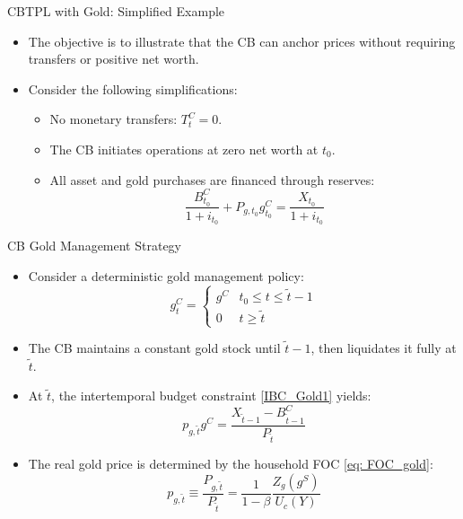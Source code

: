 \documentclass[11pt,aspectratio=169]{beamer}
\begin{document}
\iffalse
\begin{frame}{CBTPL with Gold: Simplified Example}
\begin{itemize}
    \item The objective is to illustrate that the CB can anchor prices without requiring transfers or positive net worth.
    \item Consider the following simplifications:  
    \begin{itemize}
        \item No monetary transfers: $T_t^C = 0$.
        \item The CB initiates operations at zero net worth at $t_0$.
        \item All asset and gold purchases are financed through reserves:
        \begin{equation}
            \frac{B_{t_0}^C}{1+i_{t_0}} + P_{g,t_0} g_{t_0}^C = \frac{X_{t_0}}{1+i_{t_0}}
            \label{BS0}
        \end{equation}
    \end{itemize}
\end{itemize}
\end{frame}

\begin{frame}{CB Gold Management Strategy}
\begin{itemize}
    \item Consider a deterministic gold management policy:
    \[
    g_t^C = \begin{cases} 
    g^C & t_0 \le t \le \tilde{t}-1 \\
    0 & t \ge \tilde{t}
    \end{cases}
    \]
    \item The CB maintains a constant gold stock until $\tilde{t}-1$, then liquidates it fully at $\tilde{t}$.
    \item At $\tilde{t}$, the intertemporal budget constraint \eqref{IBC_Gold1} yields:
    \begin{equation}
        p_{g,\tilde{t}} g^C = \frac{X_{\tilde{t}-1} - B_{\tilde{t}-1}^C}{P_{\tilde{t}}}
        \label{Eq_gold}
    \end{equation}
    \item The real gold price is determined by the household FOC \eqref{eq: FOC_gold}:
    \begin{equation}
        p_{g,\tilde{t}} \equiv \frac{P_{g,\tilde{t}}}{P_{\tilde{t}}} 
        = \frac{1}{1-\beta}\frac{Z_g(g^S)}{U_c(Y)}
    \end{equation}
\end{itemize}
\end{frame}
\end{document}
